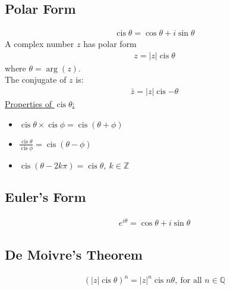 \documentclass[10pt, a4paper, titlepage]{article}
\DeclareMathOperator\cis{cis}
\begin{document}
\begin{multicols*}{3}
	\subsection{Polar Form}
	\begin{align}
		\cis{\theta}=\cos{\theta}+i\sin{\theta}
	\end{align}
	A complex number $z$ has polar form
	\begin{align}
		z=|z|\cis{\theta}
	\end{align}
	where $\theta = \arg({z})$.\\
	The conjugate of $z$ is:
	\begin{align}
		\bar{z}=|z|\cis{-\theta}
	\end{align}
	\underline{Properties of $\cis{\theta}$:}
	\begin{itemize}
		\item $\cis{\theta}\times \cis{\phi}=\cis{(\theta +\phi )}$
		\item $\frac{\cis{\theta}}{\cis{\phi}}=\cis{(\theta -\phi )}$
		\item $\cis{(\theta -2k\pi )}=\cis{\theta},\ k\in \mathbb{Z}$
	\end{itemize}

	\dotfill
	\subsection{Euler's Form}
	\begin{align}
		e^{i\theta}=\cos{\theta}+i\sin{\theta}
	\end{align}
	\dotfill
	\subsection{De Moivre's Theorem}
	\begin{align}
		(|z|\cis{\theta})^n=|z|^n\cis{n\theta},\ \text{for all }n\in \mathbb{Q}
	\end{align}



\end{multicols*}
\end{document}
